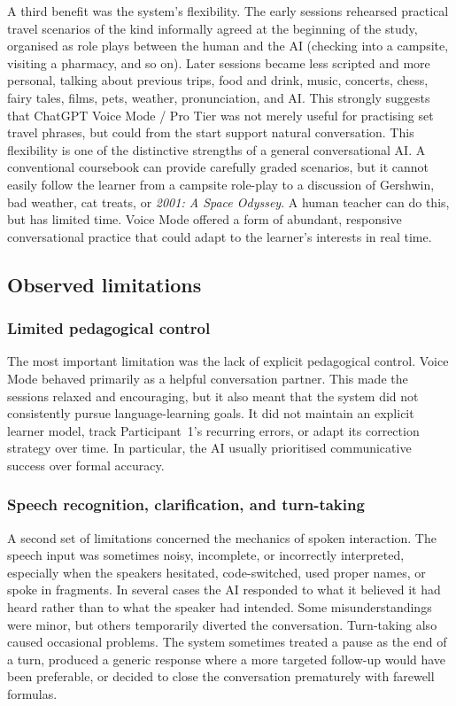 \documentclass[11pt,a4paper]{article}
\begin{document}
A third benefit was the system's flexibility. The early sessions rehearsed practical travel scenarios of the kind informally agreed at the beginning of the study, organised as role plays between the human and the AI (checking into a campsite, visiting a pharmacy, and so on). Later sessions became less scripted and more personal, talking about previous trips, food and drink, music, concerts, chess, fairy tales, films, pets, weather, pronunciation, and AI. This strongly suggests that ChatGPT Voice Mode / Pro Tier was not merely useful for practising set travel phrases, but could from the start support natural conversation. This flexibility is one of the distinctive strengths of a general conversational AI. A conventional coursebook can provide carefully graded scenarios, but it cannot easily follow the learner from a campsite role-play to a discussion of Gershwin, bad weather, cat treats, or \emph{2001: A Space Odyssey}. A human teacher can do this, but has limited time. Voice Mode offered a form of abundant, responsive conversational practice that could adapt to the learner's interests in real time.

\subsection{Observed limitations}

\subsubsection*{Limited pedagogical control}

The most important limitation was the lack of explicit pedagogical control. Voice Mode behaved primarily as a helpful conversation partner. This made the sessions relaxed and encouraging, but it also meant that the system did not consistently pursue language-learning goals. It did not maintain an explicit learner model, track Participant~1's recurring errors, or adapt its correction strategy over time. In particular, the AI usually prioritised communicative success over formal accuracy.

\subsubsection*{Speech recognition, clarification, and turn-taking}

A second set of limitations concerned the mechanics of spoken interaction. The speech input was sometimes noisy, incomplete, or incorrectly interpreted, especially when the speakers hesitated, code-switched, used proper names, or spoke in fragments. In several cases the AI responded to what it believed it had heard rather than to what the speaker had intended. Some misunderstandings were minor, but others temporarily diverted the conversation. Turn-taking also caused occasional problems. The system sometimes treated a pause as the end of a turn, produced a generic response where a more targeted follow-up would have been preferable, or decided to close the conversation prematurely with farewell formulas.
\end{document}
